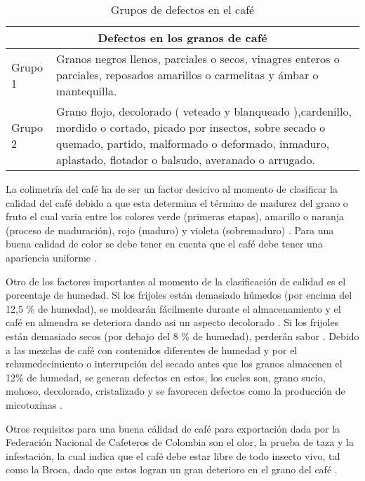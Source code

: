 \begin{table}[h]
    \begin{center}
        \caption{Grupos de defectos en el café}
        \begin{tabular}{ | m{2cm} | m{10 cm} | }
        \hline 
        \multicolumn{2}{|c|}{Defectos en los granos de café} \\ \hline
        Grupo 1 &  Granos negros llenos, parciales o secos, vinagres enteros o parciales, reposados amarillos o carmelitas y ámbar o mantequilla. \\ \hline
        Grupo 2 &  Grano flojo, decolorado ( veteado y blanqueado ),\newline cardenillo, mordido o cortado, picado por insectos, sobre secado o quemado, partido, malformado o deformado, inmaduro, aplastado, flotador o balsudo, averanado o arrugado.  \\ \hline
        \end{tabular}
        \label{tab:grupos_defectos}
    \end{center}
\end{table}

La colimetría del café ha de ser un factor desicivo al momento de clasificar la calidad del café debido a que esta determina el término de madurez del grano o fruto el cual varia entre los colores verde (primeras etapas), amarillo o naranja (proceso de maduración), rojo (maduro) y violeta (sobremaduro) \citep{herrera2011colorimetria}. Para una buena calidad de color se debe tener en cuenta que el café debe tener una apariencia uniforme \citep{resolucion}. \medskip

Otro de los factores importantes al momento de la clasificación de calidad es el porcentaje de humedad. Si los frijoles están demasiado húmedos (por encima del 12,5 \% de humedad), se moldearán fácilmente durante el almacenamiento y el café en almendra se deteriora dando asi un aspecto decolorado \cite{puerta2001como}. Si los frijoles están demasiado secos (por debajo del 8 \% de humedad), perderán sabor \citep{leroy2006genetics}. Debido a las mezclas de café con contenidos diferentes de humedad y por el rehumedecimiento o interrupción del secado antes que los granos almacenen el 12\% de humedad, se generan defectos en estos, los cueles son, grano sucio, mohoso, decolorado, cristalizado y se favorecen defectos como la producción de micotoxinas \cite{puerta2001como}. \medskip

Otros requisitos para una buena cálidad de café para exportación dada por la Federación Nacional de Cafeteros de Colombia son el olor, la prueba de taza y la infestación, la cual indica que el café debe estar libre de todo insecto vivo, tal como la Broca, dado que estos logran un gran deterioro en el grano del café \citep{resolucion}.

